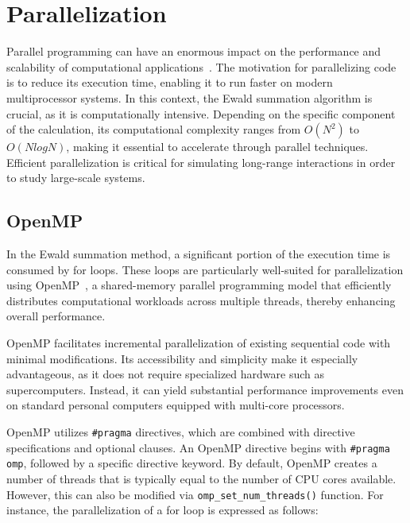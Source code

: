 \section{Parallelization}
Parallel programming can have an enormous impact on the performance and scalability of computational applications~\cite{pacheco2011introduction}. The motivation for parallelizing code is to reduce its execution time, enabling it to run faster on modern multiprocessor systems. In this context, the Ewald summation algorithm is crucial, as it is computationally intensive. Depending on the specific component of the calculation, its computational complexity ranges from $O(N^2)$ to $O(NlogN)$, making it essential to accelerate through parallel techniques. Efficient parallelization is critical for simulating long-range interactions in order to study large-scale systems.

\subsection{OpenMP}
In the Ewald summation method, a significant portion of the execution time is consumed by for loops. These loops are particularly well-suited for parallelization using OpenMP~\cite{dagum1998openmp}, a shared-memory parallel programming model that efficiently distributes computational workloads across multiple threads, thereby enhancing overall performance.


OpenMP facilitates incremental parallelization of existing sequential code with minimal modifications. Its accessibility and simplicity make it especially advantageous, as it does not require specialized hardware such as supercomputers. Instead, it can yield substantial performance improvements even on standard personal computers equipped with multi-core processors.

OpenMP utilizes \verb|#pragma|  directives, which are combined with directive specifications and optional clauses. An OpenMP directive begins with \verb|#pragma omp|, followed by a specific directive keyword. 
By default, OpenMP creates a number of threads that is typically equal to the number of CPU cores available. However, this can also be modified via \verb|omp_set_num_threads()| function. For instance, the parallelization of a for loop is expressed as follows:




